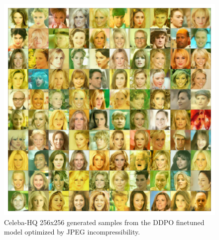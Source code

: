 \begin{appendixs}
        \begin{figure}
            \centering
            \includegraphics[scale=0.8]{img/results/ddpo-incompressibility-samples.png}
            \vspace{-4pt}  %
            \captionsetup{width=\textwidth} %
            \caption{Celeba-HQ 256x256 generated samples from the DDPO finetuned model optimized by JPEG incompressibility.}
            \label{fig:ddpo-incompressibility-samples}
        \end{figure}


\end{appendixs}
